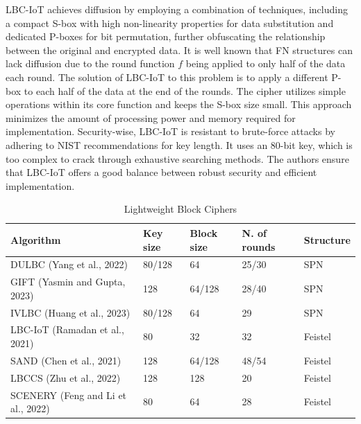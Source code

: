 \documentclass[conference]{IEEEtran}
\begin{document}
LBC-IoT achieves diffusion by employing a combination of techniques, including a compact S-box with high non-linearity properties for data substitution and dedicated P-boxes for bit permutation, further obfuscating the relationship between the original and encrypted data. It is well known that FN structures can lack diffusion due to the round function $f$ being applied to only half of the data each round. The solution of LBC-IoT to this problem is to apply a different P-box to each half of the data at the end of the rounds. The cipher utilizes simple operations within its core function and keeps the S-box size small. This approach minimizes the amount of processing power and memory required for implementation. Security-wise, LBC-IoT is resistant to brute-force attacks by adhering to NIST recommendations for key length. It uses an 80-bit key, which is too complex to crack through exhaustive searching methods. The authors ensure that LBC-IoT offers a good balance between robust security and efficient implementation.\cite{LBC-IoT}

\begin{table}[ht]
    \centering
    \caption{Lightweight Block Ciphers}
    \begin{tabular}{lllll} 
     \toprule
     Algorithm & Key size & Block size & N. of rounds & Structure \\ 
     \midrule
     DULBC (Yang et al., 2022) \cite{DULBC} & 80/128 & 64 & 25/30 & SPN \\
     GIFT (Yasmin and Gupta, 2023)\cite{GIFT}\cite{yasmin2023modified} & 128 & 64/128 & 28/40 & SPN \\
     IVLBC (Huang et al., 2023)\cite{IVLBC} & 80/128 & 64 & 29 & SPN \\
     LBC-IoT (Ramadan et al., 2021)\cite{LBC-IoT} & 80 & 32 & 32 & Feistel  \\
     SAND (Chen et al., 2021)\cite{SAND} & 128 & 64/128 & 48/54 & Feistel \\
     LBCCS (Zhu et al., 2022)\cite{LBCCS} & 128 & 128 & 20 & Feistel \\
     SCENERY (Feng and Li et al., 2022)\cite{SCENERY} & 80 & 64 & 28 & Feistel  \\
     \bottomrule
    \end{tabular}
    \label{table:ciphers}
\end{table}
\end{document}
